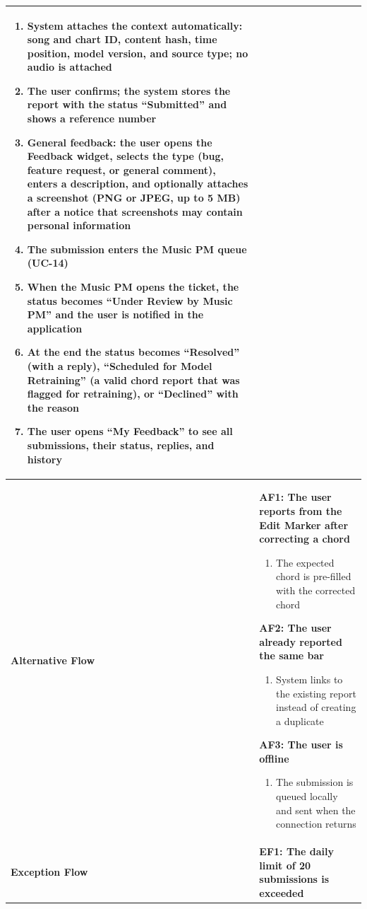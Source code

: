 \documentclass[a4paper]{article}
\newlength{\ucLeft}
\begin{document}
\begin{longtable}{|>{\bfseries}p{\ucLeft}|p{\dimexpr\linewidth-\ucLeft-2\tabcolsep-2\arrayrulewidth}|}
\begin{enumerate}[leftmargin=1.5em, nosep, topsep=2pt, partopsep=0pt, parsep=0pt, after=\strut]
    \item System attaches the context automatically: song and chart ID, content hash, time position, model version, and source type; no audio is attached
    \item The user confirms; the system stores the report with the status ``Submitted'' and shows a reference number
    \item General feedback: the user opens the Feedback widget, selects the type (bug, feature request, or general comment), enters a description, and optionally attaches a screenshot (PNG or JPEG, up to 5 MB) after a notice that screenshots may contain personal information
    \item The submission enters the Music PM queue (UC-14)
    \item When the Music PM opens the ticket, the status becomes ``Under Review by Music PM'' and the user is notified in the application
    \item At the end the status becomes ``Resolved'' (with a reply), ``Scheduled for Model Retraining'' (a valid chord report that was flagged for retraining), or ``Declined'' with the reason
    \item The user opens ``My Feedback'' to see all submissions, their status, replies, and history
\end{enumerate}
\\ \hline
Alternative Flow &
\textbf{AF1: The user reports from the Edit Marker after correcting a chord}
\begin{enumerate}[leftmargin=1.5em, nosep, topsep=2pt, partopsep=0pt, parsep=0pt, after=\strut]
    \item The expected chord is pre-filled with the corrected chord
\end{enumerate}
\textbf{AF2: The user already reported the same bar}
\begin{enumerate}[leftmargin=1.5em, nosep, topsep=2pt, partopsep=0pt, parsep=0pt, after=\strut]
    \item System links to the existing report instead of creating a duplicate
\end{enumerate}
\textbf{AF3: The user is offline}
\begin{enumerate}[leftmargin=1.5em, nosep, topsep=2pt, partopsep=0pt, parsep=0pt, after=\strut]
    \item The submission is queued locally and sent when the connection returns
\end{enumerate}
\\ \hline
Exception Flow &
\textbf{EF1: The daily limit of 20 submissions is exceeded}

\end{longtable}
\end{document}
